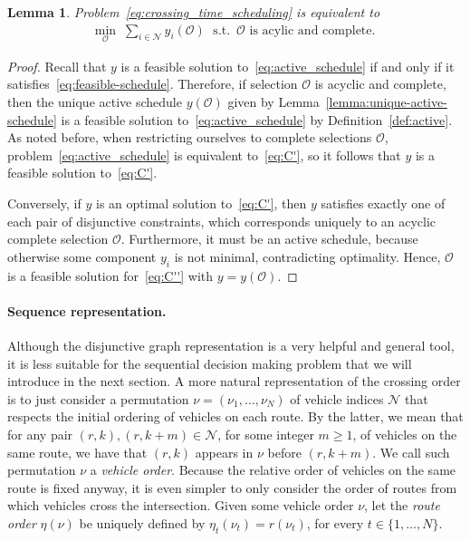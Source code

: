 \documentclass[a4paper]{report}
\theoremstyle{definition}
\theoremstyle{plain}
\newtheorem{lemma}{Lemma}[chapter]
\begin{document}
\begin{lemma}\label{lemma:disj-graph-optimization}
  Problem~\eqref{eq:crossing_time_scheduling} is equivalent to
  \begin{align}
    \label{eq:C''}
    \min_{\mathcal{O}} \; \sum_{i \in \mathcal{N}} y_i(\mathcal{O}) \; \text{ s.t. } \, \mathcal{O} \text{ is acylic and complete. }
  \end{align}
\end{lemma}
\begin{proof}
  Recall that $y$ is a feasible solution to~\eqref{eq:active_schedule} if and
  only if it satisfies~\eqref{eq:feasible-schedule}. Therefore, if selection
  $\mathcal{O}$ is acyclic and complete, then the unique active schedule
  $y(\mathcal{O})$ given by Lemma~\ref{lemma:unique-active-schedule} is a
  feasible solution to~\eqref{eq:active_schedule} by
  Definition~\ref{def:active}.
  As noted before, when restricting ourselves to complete selections
  $\mathcal{O}$, problem~\eqref{eq:active_schedule} is equivalent
  to~\eqref{eq:C'}, so it follows that $y$ is a feasible solution
  to~\eqref{eq:C'}.

  Conversely, if $y$ is an optimal solution to~\eqref{eq:C'}, then $y$ satisfies
  exactly one of each pair of disjunctive constraints, which corresponds
  uniquely to an acyclic complete selection $\mathcal{O}$.
  Furthermore, it must be an active schedule, because otherwise some component
  $y_i$ is not minimal, contradicting optimality. Hence, $\mathcal{O}$ is a
  feasible solution for~\eqref{eq:C''} with $y = y(\mathcal{O})$.
\end{proof}

\paragraph{Sequence representation.}
Although the disjunctive graph representation is a very helpful and general
tool, it is less suitable for the sequential decision making problem that we
will introduce in the next section.
%
A more natural representation of the crossing order is to just consider a
permutation $\nu = (\nu_1, \dots, \nu_N)$ of vehicle indices $\mathcal{N}$ that respects
the initial ordering of vehicles on each route. By the latter, we mean that for
any pair $(r, k), (r, k + m) \in \mathcal{N}$, for some integer $m \geq 1$, of
vehicles on the same route, we have that $(r,k)$ appears in $\nu$ before
$(r,k+m)$. We call such permutation $\nu$ a \emph{vehicle order}.
%
Because the relative order of vehicles on the same route is fixed anyway, it is
even simpler to only consider the order of routes from which vehicles cross the
intersection.
%
Given some vehicle order $\nu$, let the \emph{route order} $\eta(\nu)$ be
uniquely defined by $\eta_t(\nu_t) = r(\nu_t)$, for every
$t \in \{ 1, \dots, N \}$.
\end{document}
